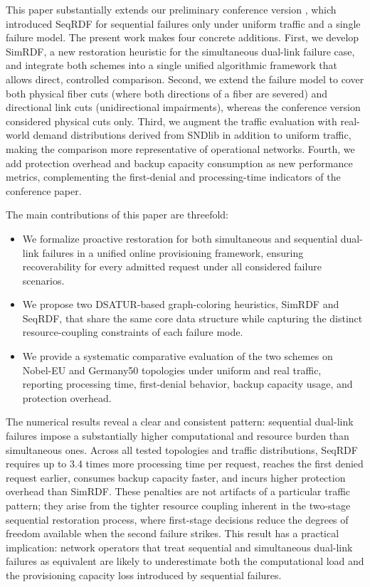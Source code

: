 \documentclass[conference]{IEEEtran}
\begin{document}
This paper substantially extends our preliminary conference version \cite{Jaumard2026AGraphColoring}, which introduced SeqRDF for sequential failures only under uniform traffic and a single failure model. The present work makes four concrete additions. First, we develop SimRDF, a new restoration heuristic for the simultaneous dual-link failure case, and integrate both schemes into a single unified algorithmic framework that allows direct, controlled comparison. Second, we extend the failure model to cover both physical fiber cuts (where both directions of a fiber are severed) and directional link cuts (unidirectional impairments), whereas the conference version considered physical cuts only. Third, we augment the traffic evaluation with real-world demand distributions derived from SNDlib in addition to uniform traffic, making the comparison more representative of operational networks. Fourth, we add protection overhead and backup capacity consumption as new performance metrics, complementing the first-denial and processing-time indicators of the conference paper.

The main contributions of this paper are threefold:
\begin{itemize}
    \item We formalize proactive restoration for both simultaneous and sequential dual-link failures in a unified online provisioning framework, ensuring recoverability for every admitted request under all considered failure scenarios.
    \item We propose two DSATUR-based graph-coloring heuristics, SimRDF and SeqRDF, that share the same core data structure while capturing the distinct resource-coupling constraints of each failure mode.
    \item We provide a systematic comparative evaluation of the two schemes on Nobel-EU and Germany50 topologies under uniform and real traffic, reporting processing time, first-denial behavior, backup capacity usage, and protection overhead.
\end{itemize}

The numerical results reveal a clear and consistent pattern: sequential dual-link failures impose a substantially higher computational and resource burden than simultaneous ones. Across all tested topologies and traffic distributions, SeqRDF requires up to 3.4 times more processing time per request, reaches the first denied request earlier, consumes backup capacity faster, and incurs higher protection overhead than SimRDF. These penalties are not artifacts of a particular traffic pattern; they arise from the tighter resource coupling inherent in the two-stage sequential restoration process, where first-stage decisions reduce the degrees of freedom available when the second failure strikes. This result has a practical implication: network operators that treat sequential and simultaneous dual-link failures as equivalent are likely to underestimate both the computational load and the provisioning capacity loss introduced by sequential failures.
\end{document}
